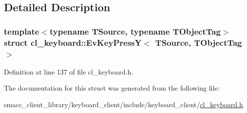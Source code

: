 \subsection{Detailed Description}
\subsubsection*{template$<$typename T\+Source, typename T\+Object\+Tag$>$\newline
struct cl\+\_\+keyboard\+::\+Ev\+Key\+Press\+Y$<$ T\+Source, T\+Object\+Tag $>$}



Definition at line 137 of file cl\+\_\+keyboard.\+h.



The documentation for this struct was generated from the following file\+:\begin{DoxyCompactItemize}
\item 
smacc\+\_\+client\+\_\+library/keyboard\+\_\+client/include/keyboard\+\_\+client/\hyperlink{cl__keyboard_8h}{cl\+\_\+keyboard.\+h}\end{DoxyCompactItemize}
